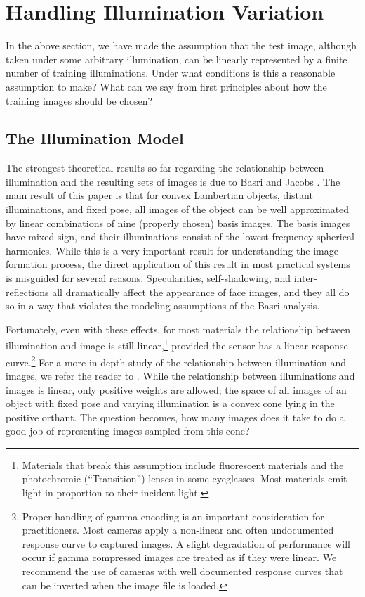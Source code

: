 \documentclass[10pt,journal,letterpaper,compsoc]{IEEEtran} %
\begin{document}
\section{Handling Illumination Variation}\label{sec:illumination}
In the above section, we have made the assumption that the test image, although taken under some arbitrary illumination, can be linearly represented by a finite number of training illuminations.  Under what conditions is this a reasonable assumption to make?  What can we say from first principles about how the training images should be chosen?

\subsection{The Illumination Model}

The strongest theoretical results so far regarding the relationship
between illumination and the resulting sets of images is due to Basri and Jacobs \cite{Basri2003-PAMI}.
The main result of this paper is that for convex Lambertian objects, distant illuminations, and fixed pose,
all images of the object can be well approximated by linear combinations of
nine (properly chosen) basis images.  The basis images have mixed sign, and
their illuminations consist of the lowest frequency spherical harmonics.
While this is a very important result for understanding the image
formation process, the direct application of this result in most practical
systems is misguided for several reasons.
Specularities, self-shadowing, and inter-reflections all dramatically affect the appearance of face images,
and they all do so in a way that violates the modeling assumptions of the Basri analysis.

Fortunately, even with these effects, for most materials the relationship between
illumination and image is still linear,\footnote{Materials that break
this assumption include fluorescent materials and the photochromic (``Transition'') lenses
in some eyeglasses.  Most materials emit light in proportion to their
incident light.} provided the sensor has a linear response curve.\footnote{Proper handling of gamma encoding is an important consideration for
practitioners.  Most cameras apply a non-linear and often undocumented response
curve to captured images.  A slight degradation of performance will occur if
gamma compressed images are treated as if they were linear.  We recommend the use
of cameras with well documented response curves that can be inverted when the
image file is loaded.}
For a more in-depth study
of the relationship between illumination and images, we refer the reader to
\cite{belhumeur1998set}.
While the relationship between illuminations and images is linear,
only positive weights are allowed; the space of all images of an object with
fixed pose and varying illumination is a convex cone lying in the positive
orthant. The question becomes, how many images does it take to do a good job
of representing images sampled from this cone?
\end{document}
